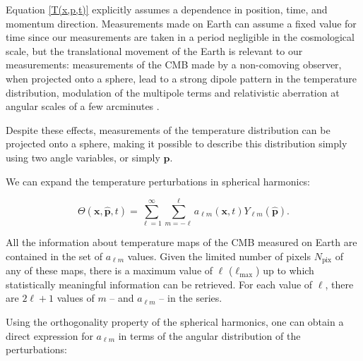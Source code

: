 \documentclass[openany,a4paper,12pt,oneside]{book}
\begin{document}
\begin{spacing}{1.5}
Equation \eqref{T(x,p,t)} explicitly assumes a dependence in position, time, and momentum direction. Measurements made on Earth can assume a fixed value for time since our measurements are taken in a period negligible in the cosmological scale, but the translational movement of the Earth is relevant to our measurements: measurements of the CMB made by a non-comoving observer, when projected onto a sphere, lead to a strong dipole pattern in the temperature distribution, modulation of the multipole terms and relativistic aberration at angular scales of a few arcminutes \cite{COBE_calibration, Planck_doppler, esteban_msc}.

Despite these effects, measurements of the temperature distribution can be projected onto a sphere, making it possible to describe this distribution simply using two angle variables, or simply $\hat{\mathbf{p}}$.

We can expand the temperature perturbations in spherical harmonics:

\begin{equation}\label{ch2:Theta_spherical harmonics}
    \Theta(\mathbf{x}, \hat{\mathbf{p}}, t)=\sum_{\ell=1}^\infty \sum_{m=-\ell}^\ell a_{\ell m}(\mathbf{x}, t)Y_{\ell m}(\hat{\mathbf{p}}).
\end{equation}

All the information about temperature maps of the CMB measured on Earth are contained in the set of $a_{\ell m}$ values. Given the limited number of pixels $N_\text{pix}$ of any of these maps, there is a maximum value of $\ell$ ($\ell_\text{max}$) up to which statistically meaningful information can be retrieved. For each value of $\ell$, there are $2\ell+1$ values of $m$ -- and $a_{\ell m}$ -- in the series. %


Using the orthogonality property of the spherical harmonics, one can obtain a direct expression for $a_{\ell m}$ in terms of the angular distribution of the perturbations:


\end{spacing}
\end{document}
